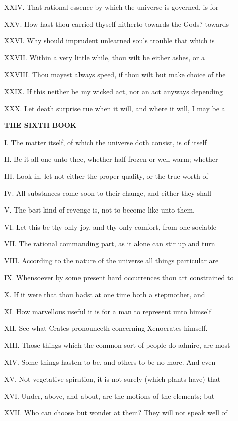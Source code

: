 XXIV. That rational essence by which the
universe is governed, is for

XXV. How hast thou carried thyself hitherto
towards the Gods? towards

XXVI. Why should imprudent unlearned souls
trouble that which is

XXVII. Within a very little while, thou wilt
be either ashes, or a

XXVIII. Thou mayest always speed, if thou wilt
but make choice of the

XXIX. If this neither be my wicked act, nor an
act anyways depending

XXX. Let death surprise rue when it will, and
where it will, I may be a

\textbf{THE SIXTH BOOK}

I. The matter itself, of which the universe
doth consist, is of itself

II. Be it all one unto thee, whether half
frozen or well warm; whether

III. Look in, let not either the proper
quality, or the true worth of

IV. All substances come soon to their change,
and either they shall

V. The best kind of revenge is, not to become
like unto them.

VI. Let this be thy only joy, and thy only
comfort, from one sociable

VII. The rational commanding part, as it alone
can stir up and turn

VIII. According to the nature of the universe
all things particular are

IX. Whensoever by some present hard
occurrences thou art constrained to

X. If it were that thou hadst at one time both
a stepmother, and

XI. How marvellous useful it is for a man to
represent unto himself

XII. See what Crates pronounceth concerning
Xenocrates himself.

XIII. Those things which the common sort of
people do admire, are most

XIV. Some things hasten to be, and others to
be no more. And even

XV. Not vegetative spiration, it is not surely
(which plants have) that

XVI. Under, above, and about, are the motions
of the elements; but

XVII. Who can choose but wonder at them? They
will not speak well of

